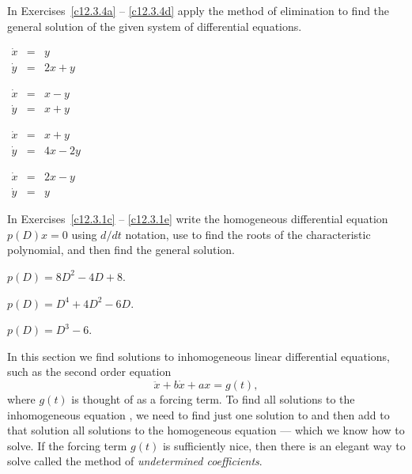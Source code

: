 \noindent In Exercises~\ref{c12.3.4a} -- \ref{c12.3.4d} apply the
method of elimination to find the general solution of the given
system of differential equations.
\begin{exercise} \label{c12.3.4a}
$\begin{array}{rcl}
\dot{x} & = & y\\
\dot{y} & = & 2x+y
\end{array}$
\end{exercise}
\begin{exercise} \label{c12.3.4b}
$\begin{array}{rcl}
\dot{x} & = & x-y\\
\dot{y} & = & x+y
\end{array}$
\end{exercise}
\begin{exercise} \label{c12.3.4c}
$\begin{array}{rcl}
\dot{x} & = & x+y\\
\dot{y} & = & 4x-2y
\end{array}$
\end{exercise}
\begin{exercise} \label{c12.3.4d}
$\begin{array}{rcl}
\dot{x} & = & 2x-y\\
\dot{y} & = & y
\end{array}$
\end{exercise}

\CEXER

\noindent In Exercises~\ref{c12.3.1c} -- \ref{c12.3.1e} write the 
homogeneous differential equation $p(D)x=0$ using $d/dt$ notation,
use \Matlab to find the roots of the characteristic polynomial, and 
then find the general solution.
\begin{exercise}  \label{c12.3.1c}
$p(D) = 8D^2 - 4D +8$.
\end{exercise}
\begin{exercise}  \label{c12.3.1d}
$p(D) = D^4 + 4D^2 - 6D$.
\end{exercise}
\begin{exercise}  \label{c12.3.1e}
$p(D) = D^3 -6$.
\end{exercise}

\label{sec:2norderinhom}

In this section we find solutions to inhomogeneous linear differential 
equations, such as the second order equation
\begin{equation}  \label{e:inhom1}
\ddot{x} + b\dot{x} + ax = g(t),
\end{equation}
where $g(t)$ is thought of as a forcing term.   
To find all solutions to 
the inhomogeneous 
equation , we need to find just one solution
to  and then add to that solution all solutions to the 
homogeneous equation --- which we know how to solve.  If the forcing term 
$g(t)$ is sufficiently nice, then there is an elegant way to solve 
 called the method of 
{\em undetermined coefficients}.


